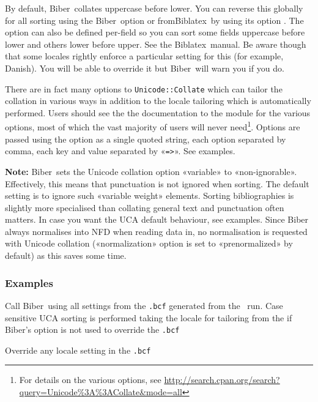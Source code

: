 \documentclass{ltxdockit}
\newcommand*{\biber}{Biber\xspace}
\newcommand*{\biblatex}{Biblatex\xspace}
\def\biberex#1{\hbox{\hspace{-4em}\texttt{\small \detokenize{#1}}}}
\begin{document}
By default, \biber\ collates uppercase before lower.
You can reverse this globally for all sorting using the \biber\ option
 or from\linebreak[4]\biblatex\ by using its option
. The option can also be defined per-field so you can
sort some fields uppercase before lower and others lower before upper. See the
\biblatex\ manual. Be aware though that some locales rightly enforce a
particular setting for this (for example, Danish). You will be able to
override it but \biber\ will warn you if you do.

There are in fact many options to \verb+Unicode::Collate+
which can tailor the collation in various ways in
addition to the locale tailoring which is automatically performed.
Users should see the the documentation to the module for the various
options, most of which the vast majority of users will never
need\footnote{For details on the various options, see
  \url{http://search.cpan.org/search?query=Unicode\%3A\%3ACollate&mode=all}}.
Options are passed using the  option as a
single quoted string, each option separated by comma, each key and
value separated by «\verb+=>+». See examples.

\textbf{Note:} \biber\ sets the Unicode collation option
«variable» to «non-ignorable». Effectively, this means that punctuation is
not ignored when sorting. The default setting is to ignore such «variable
weight» elements. Sorting bibliographies is slightly more specialised than
collating general text and punctuation often matters. In case you want the
UCA default behaviour, see examples. Since \biber always normalises into
NFD when reading data in, no normalisation is requested with Unicode
collation («normalization» option is set to «prenormalized» by default) as
this saves some time.

\subsubsection{Examples}

\biberex{biber}

\noindent Call \biber\ using all settings from the \verb+.bcf+ generated from the
\latex\ run. Case sensitive UCA sorting is performed taking the locale
for tailoring from the  if \biber's  option is
not used to override the \verb+.bcf+

\biberex{biber --sortlocale=de_DE_phonebook}

\noindent Override any locale setting in the \verb+.bcf+
\end{document}
